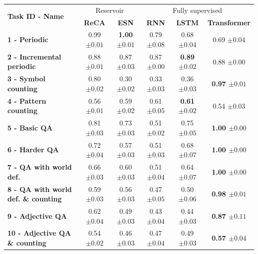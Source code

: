 \begin{table}[htbp]
  \centering
    \begin{tabular}{lcc|ccc}
      \toprule
      \multirow{2}{*}{\bfseries Task ID - Name} & \multicolumn{2}{c|}{Reservoir} &
        \multicolumn{3}{c}{Fully supervised} \\
& \bfseries ReCA & \bfseries ESN & \bfseries RNN & \bfseries LSTM & \bfseries Transformer  \\
\midrule
\bfseries 1 - Periodic & 0.99 ${\scriptscriptstyle \pm 0.01}$ & \bfseries 1.00 ${\scriptscriptstyle \pm 0.01}$ & 0.79 ${\scriptscriptstyle \pm 0.08}$ & 0.68 ${\scriptscriptstyle \pm 0.04}$ & 0.69 ${\scriptscriptstyle \pm 0.04}$  \\
\bfseries 2 - Incremental periodic & 0.88 ${\scriptscriptstyle \pm 0.01}$ & 0.87 ${\scriptscriptstyle \pm 0.03}$ & 0.87 ${\scriptscriptstyle \pm 0.00}$ & \bfseries 0.89 ${\scriptscriptstyle \pm 0.02}$ & 0.88 ${\scriptscriptstyle \pm 0.00}$  \\
\bfseries 3 - Symbol counting & 0.80 ${\scriptscriptstyle \pm 0.02}$ & 0.30 ${\scriptscriptstyle \pm 0.02}$ & 0.33 ${\scriptscriptstyle \pm 0.03}$ & 0.36 ${\scriptscriptstyle \pm 0.03}$ & \bfseries 0.97 ${\scriptscriptstyle \pm 0.01}$  \\
\bfseries 4 - Pattern counting & 0.56 ${\scriptscriptstyle \pm 0.01}$ & 0.59 ${\scriptscriptstyle \pm 0.02}$ & 0.61 ${\scriptscriptstyle \pm 0.05}$ & \bfseries 0.61 ${\scriptscriptstyle \pm 0.02}$ & 0.54 ${\scriptscriptstyle \pm 0.03}$  \\
\bfseries 5 - Basic QA & 0.81 ${\scriptscriptstyle \pm 0.03}$ & 0.73 ${\scriptscriptstyle \pm 0.03}$ & 0.51 ${\scriptscriptstyle \pm 0.02}$ & 0.75 ${\scriptscriptstyle \pm 0.05}$ & \bfseries 1.00 ${\scriptscriptstyle \pm 0.00}$  \\
\bfseries 6 - Harder QA & 0.72 ${\scriptscriptstyle \pm 0.04}$ & 0.57 ${\scriptscriptstyle \pm 0.03}$ & 0.51 ${\scriptscriptstyle \pm 0.03}$ & 0.68 ${\scriptscriptstyle \pm 0.07}$ & \bfseries 1.00 ${\scriptscriptstyle \pm 0.00}$  \\
\bfseries 7 - QA with world def. & 0.66 ${\scriptscriptstyle \pm 0.03}$ & 0.60 ${\scriptscriptstyle \pm 0.03}$ & 0.51 ${\scriptscriptstyle \pm 0.04}$ & 0.64 ${\scriptscriptstyle \pm 0.07}$ & \bfseries 1.00 ${\scriptscriptstyle \pm 0.00}$  \\
\bfseries 8 - QA with world def. \& counting & 0.59 ${\scriptscriptstyle \pm 0.03}$ & 0.56 ${\scriptscriptstyle \pm 0.03}$ & 0.47 ${\scriptscriptstyle \pm 0.05}$ & 0.50 ${\scriptscriptstyle \pm 0.06}$ & \bfseries 0.98 ${\scriptscriptstyle \pm 0.01}$  \\
\bfseries 9 - Adjective QA & 0.62 ${\scriptscriptstyle \pm 0.04}$ & 0.49 ${\scriptscriptstyle \pm 0.03}$ & 0.43 ${\scriptscriptstyle \pm 0.04}$ & 0.44 ${\scriptscriptstyle \pm 0.03}$ & \bfseries 0.87 ${\scriptscriptstyle \pm 0.11}$  \\
\bfseries 10 - Adjective QA \& counting & 0.54 ${\scriptscriptstyle \pm 0.02}$ & 0.46 ${\scriptscriptstyle \pm 0.03}$ & 0.47 ${\scriptscriptstyle \pm 0.04}$ & 0.49 ${\scriptscriptstyle \pm 0.03}$ & \bfseries 0.57 ${\scriptscriptstyle \pm 0.04}$  \\



\end{tabular}
\end{table}

